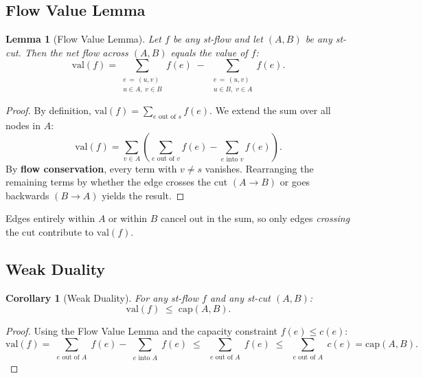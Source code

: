 \documentclass[12pt,a4paper]{report}
\newtheorem{lemma}{Lemma}
\newtheorem{corollary}{Corollary}
\begin{document}
\subsection{Flow Value Lemma}

\begin{lemma}[Flow Value Lemma]
    Let $f$ be any st-flow and let $(A, B)$ be any st-cut. Then the
    \emph{net flow} across $(A, B)$ equals the value of $f$:
    \[
        \mathrm{val}(f)
        = \sum_{\substack{e \,=\,(u,v) \\ u \in A,\; v \in B}} f(e)
        \;-\;
        \sum_{\substack{e \,=\,(u,v) \\ u \in B,\; v \in A}} f(e).
    \]
\end{lemma}

\begin{proof}
By definition, $\mathrm{val}(f) = \sum_{e \text{ out of } s} f(e)$.
We extend the sum over all nodes in $A$:
\[
    \mathrm{val}(f)
    = \sum_{v \in A}
      \left(
        \sum_{e \text{ out of } v} f(e)
        - \sum_{e \text{ into } v} f(e)
      \right).
\]
By \textbf{flow conservation}, every term with $v \neq s$ vanishes.
Rearranging the remaining terms by whether the edge crosses the cut
$(A \to B)$ or goes backwards $(B \to A)$ yields the result.
\end{proof}

    Edges entirely within $A$ or within $B$ cancel out in the sum,
    so only edges \emph{crossing} the cut contribute to $\mathrm{val}(f)$.


\subsection{Weak Duality}

\begin{corollary}[Weak Duality]
    For any st-flow $f$ and any st-cut $(A, B)$:
    \[
        \mathrm{val}(f) \;\leq\; \mathrm{cap}(A, B).
    \]
\end{corollary}

\begin{proof}
Using the Flow Value Lemma and the capacity constraint $f(e) \leq c(e)$:
\[
    \mathrm{val}(f)
    = \sum_{\substack{e \text{ out of } A}} f(e)
    - \sum_{\substack{e \text{ into } A}} f(e)
    \;\leq\;
    \sum_{\substack{e \text{ out of } A}} f(e)
    \;\leq\;
    \sum_{\substack{e \text{ out of } A}} c(e)
    = \mathrm{cap}(A,B).
\]
\end{proof}
\end{document}

